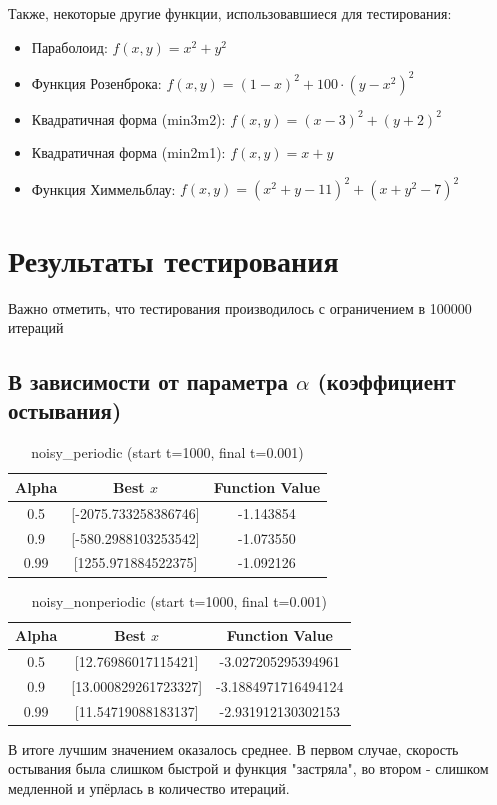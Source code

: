 \documentclass{article}
\begin{document}
Также, некоторые другие функции, использовавшиеся для тестирования:

\begin{itemize}
    \item Параболоид: $f(x, y) = x^2 + y^2$
    \item Функция Розенброка: $f(x, y) = (1 - x)^2 + 100 \cdot (y - x^2)^2$
    \item Квадратичная форма (min3m2): $f(x, y) = (x - 3)^2 + (y + 2)^2$
    \item Квадратичная форма (min2m1): $f(x, y) = x + y$
    \item Функция Химмельблау: $f(x, y) = (x^2 + y - 11)^2 + (x + y^2 - 7)^2$
\end{itemize}


\section{Результаты тестирования}
Важно отметить, что тестирования производилось с ограничением в 100000 итераций

\subsection{В зависимости от параметра $\alpha$ (коэффициент остывания)}
\begin{table}[H]
\centering
\begin{tabular}{|c|c|c|}
\hline
\textbf{Alpha} & \textbf{Best $x$} & \textbf{Function Value} \\
\hline
0.5 & [-2075.733258386746] & -1.143854 \\
0.9 & [-580.2988103253542] & -1.073550 \\
0.99 & [1255.971884522375] & -1.092126 \\
\hline
\end{tabular}
\caption{noisy\_periodic (start t=1000, final t=0.001)}
\end{table}
\begin{table}[H]
\centering
\begin{tabular}{|c|c|c|}
\hline
\textbf{Alpha} & \textbf{Best $x$} & \textbf{Function Value} \\
\hline
0.5 & [12.76986017115421] & -3.027205295394961 \\
0.9 & [13.000829261723327] & -3.1884971716494124 \\
0.99 & [11.54719088183137] & -2.931912130302153 \\
\hline
\end{tabular}
\caption{noisy\_nonperiodic (start t=1000, final t=0.001)}
\end{table}
В итоге лучшим значением оказалось среднее. В первом случае, скорость остывания была слишком быстрой и функция "застряла", во втором - слишком медленной и упёрлась в количество итераций.
\end{document}
